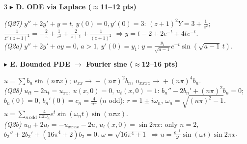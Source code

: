 \documentclass[a4paper,8pt]{extarticle}
\newcommand{\To}{\!\to\!}
\begin{document}
\begin{multicols}{3}
\textbf{\textcolor{cB}{$\blacktriangleright$ D. ODE via Laplace ($\approx$11--12 pts)}}\par
\emph{(Q27)} $y''{+}2y'{+}y{=}t$, $y(0){=}0,y'(0){=}3$: $(z{+}1)^2Y{=}3{+}\frac1{z^2}$; $\frac1{z^2(z+1)^2}{=}{-}\frac2z{+}\frac1{z^2}{+}\frac2{z+1}{+}\frac1{(z+1)^2}$ $\Rightarrow\boxed{y{=}t{-}2{+}2e^{-t}{+}4te^{-t}}$.\\
\emph{(Q2a)} $y''{+}2y'{+}ay{=}0$, $a{>}1$, $y'(0){=}y_1$: $\boxed{y{=}\frac{y_1}{\sqrt{a-1}}e^{-t}\sin(\sqrt{a-1}\,t)}$.
\smallskip

\textbf{\textcolor{cC}{$\blacktriangleright$ E. Bounded PDE $\to$ Fourier sine ($\approx$12--16 pts)}}\par
$u{=}\sum b_n\sin(n\pi x)$; $u_{xx}{\To}{-}(n\pi)^2b_n$, $u_{xxxx}{\To}{+}(n\pi)^4b_n$.\\
\emph{(Q28)} $u_{tt}{-}2u_t{=}u_{xx}$, $u(x,0){=}0$, $u_t(x,0){=}1$: $b_n''{-}2b_n'{+}(n\pi)^2b_n{=}0$; $b_n(0){=}0$, $b_n'(0){=}c_n{=}\frac{4}{n\pi}$ ($n$ odd); $r{=}1{\pm}i\omega_n$, $\omega_n{=}\sqrt{(n\pi)^2{-}1}$.\\
$\boxed{u{=}\!\!\sum_{n\,\text{odd}}\!\!\frac4{n\pi\omega_n}e^t\sin(\omega_n t)\sin(n\pi x)}$.\\[2pt]
\emph{(Q2b)} $u_{tt}{+}2u_t{=}{-}u_{xxxx}{-}2u$, $u_t(x,0){=}\sin2\pi x$: only $n{=}2$, $b_2''{+}2b_2'{+}(16\pi^4{+}2)b_2{=}0$, $\omega{=}\sqrt{16\pi^4{+}1}$ $\Rightarrow\boxed{u{=}\frac{e^{-t}}\omega\sin(\omega t)\sin2\pi x}$.


\end{multicols}
\end{document}
